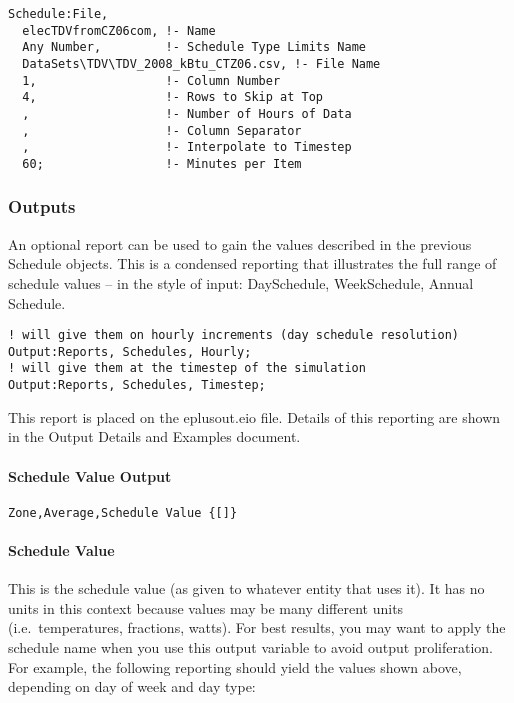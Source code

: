 \begin{lstlisting}
Schedule:File,
  elecTDVfromCZ06com, !- Name
  Any Number,         !- Schedule Type Limits Name
  DataSets\TDV\TDV_2008_kBtu_CTZ06.csv, !- File Name
  1,                  !- Column Number
  4,                  !- Rows to Skip at Top
  ,                   !- Number of Hours of Data
  ,                   !- Column Separator
  ,                   !- Interpolate to Timestep
  60;                 !- Minutes per Item
\end{lstlisting}

\subsubsection{Outputs}\label{outputs-031}

An optional report can be used to gain the values described in the previous Schedule objects. This is a condensed reporting that illustrates the full range of schedule values -- in the style of input: DaySchedule, WeekSchedule, Annual Schedule.

\begin{lstlisting}
! will give them on hourly increments (day schedule resolution)
Output:Reports, Schedules, Hourly;
! will give them at the timestep of the simulation
Output:Reports, Schedules, Timestep;
\end{lstlisting}

This report is placed on the eplusout.eio file. Details of this reporting are shown in the Output Details and Examples document.

\paragraph{Schedule Value Output}\label{schedule-value-output}

\begin{lstlisting}
Zone,Average,Schedule Value {[]}
\end{lstlisting}

\paragraph{Schedule Value}\label{schedule-value}

This is the schedule value (as given to whatever entity that uses it). It has no units in this context because values may be many different units (i.e.~temperatures, fractions, watts). For best results, you may want to apply the schedule name when you use this output variable to avoid output proliferation. For example, the following reporting should yield the values shown above, depending on day of week and day type:

